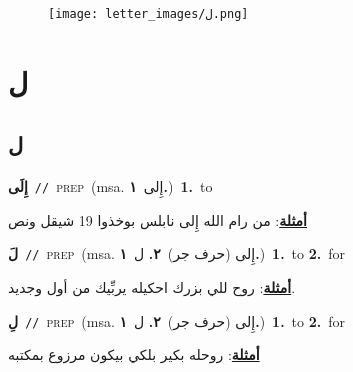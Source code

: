 \documentclass[10pt,a4paper,twoside]{article} %
\begin{document}
\begin{figure*}[t!]\centering\texttt{[image: letter\_images/ل.png]}\end{figure*}
\color{white}

 \section*{\foreignlanguage{arabic}{ل}} 
 \begin{multicols}{2} 

%
\color{black}
\vspace{-3mm}
\subsection*{\color{blue}\foreignlanguage{arabic}{ل}\color{blue}{ (ntws)}} 

{\setlength\topsep{0pt}\textbf{\foreignlanguage{arabic}{إِلَى}}\ {\color{gray}\texttt{//}\color{black}}\ \textsc{prep}\ \color{gray}(msa. \foreignlanguage{arabic}{إِلى}~\foreignlanguage{arabic}{\textbf{١.}})\color{black}\ \textbf{1.}~to\  \begin{flushright}\color{gray}\foreignlanguage{arabic}{\textbf{\underline{\foreignlanguage{arabic}{أمثلة}}}: من رام الله إِلى نابلس بوخذوا 19 شيقل ونص}\end{flushright}\color{black}} \vspace{2mm}

{\setlength\topsep{0pt}\textbf{\foreignlanguage{arabic}{لَ}}\ {\color{gray}\texttt{//}\color{black}}\ \textsc{prep}\ \color{gray}(msa. \foreignlanguage{arabic}{إِلى (حرف جر)}~\foreignlanguage{arabic}{\textbf{٢.}}  \foreignlanguage{arabic}{ل}~\foreignlanguage{arabic}{\textbf{١.}})\color{black}\ \textbf{1.}~to  \textbf{2.}~for\  \begin{flushright}\color{gray}\foreignlanguage{arabic}{\textbf{\underline{\foreignlanguage{arabic}{أمثلة}}}: روح للي بزرك احكيله يربِّيك من أول وجديد.}\end{flushright}\color{black}} \vspace{2mm}

{\setlength\topsep{0pt}\textbf{\foreignlanguage{arabic}{لِ}}\ {\color{gray}\texttt{//}\color{black}}\ \textsc{prep}\ \color{gray}(msa. \foreignlanguage{arabic}{إِلى (حرف جر)}~\foreignlanguage{arabic}{\textbf{٢.}}  \foreignlanguage{arabic}{ل}~\foreignlanguage{arabic}{\textbf{١.}})\color{black}\ \textbf{1.}~to  \textbf{2.}~for\  \begin{flushright}\color{gray}\foreignlanguage{arabic}{\textbf{\underline{\foreignlanguage{arabic}{أمثلة}}}: روحله بكير بلكي بيكون مرزوع بمكتبه}\end{flushright}\color{black}} \vspace{2mm}


\end{multicols}
\end{document}
